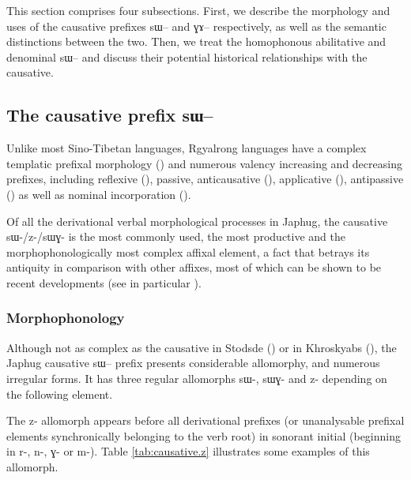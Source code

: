 \documentclass[oldfontcommands,oneside,a4paper,11pt]{article}
\newcommand{\ipa}[1]{{\phon \mbox{#1}}} %
\begin{document}
This section comprises four subsections. First, we describe the morphology and uses of the causative prefixes \ipa{sɯ--} and \ipa{ɣɤ--} respectively, as well as the semantic distinctions between the two. Then, we treat the homophonous abilitative and denominal \ipa{sɯ--} and discuss their potential historical relationships with the causative.



\subsection{The causative prefix  \ipa{sɯ--}}

Unlike most Sino-Tibetan languages, Rgyalrong languages have a complex templatic prefixal morphology (\citealt{jacques13harmonization}) and numerous valency increasing and decreasing prefixes, including reflexive (\citealt{jacques10refl}), passive, anticausative (\citealt{jacques12demotion}), applicative (\citealt{jacques13tropative}), antipassive (\citealt{jacques14antipassive}) as well as nominal incorporation (\citealt{jacques12incorp}).

Of all the derivational verbal morphological processes in Japhug, the causative \ipa{sɯ-/z-/sɯɣ-} is the most commonly used, the most productive and the morphophonologically most complex affixal element, a fact that betrays its antiquity in comparison with other affixes, most of which can be shown to be recent developments (see in particular \citealt{jacques14antipassive}).


\subsubsection{Morphophonology} \label{subsub:caus:morphophon}
Although not as complex as the causative in Stodsde (\citealt{jackson07shangzhai}) or in Khroskyabs (\citealt{lai14caus}), the Japhug causative   \ipa{sɯ--} prefix presents  considerable allomorphy, and numerous irregular forms. It has three regular allomorphs \ipa{sɯ-}, \ipa{sɯɣ-} and \ipa{z-} depending on the following element.

The \ipa{z-} allomorph appears before all derivational prefixes (or unanalysable prefixal elements synchronically belonging to the verb root) in sonorant initial (beginning in \ipa{r-}, \ipa{n-}, \ipa{ɣ-} or \ipa{m-}). Table \ref{tab:causative.z} illustrates some examples of this allomorph.
\end{document}
